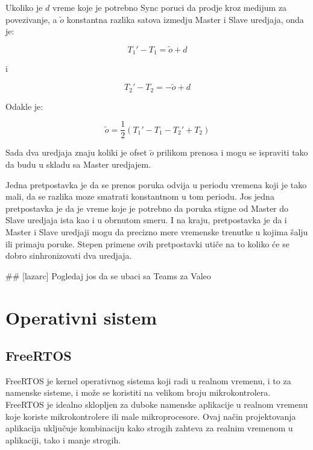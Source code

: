 \documentclass[a4paper,12pt, master]{etf}
\begin{document}
	Ukoliko je $d$ vreme koje je potrebno Sync poruci da prodje kroz medijum za povezivanje, a
        $\tilde{o}$ konstantna razlika satova izmedju Master i Slave uredjaja, onda je:

	\begin{equation}
		T_1' - T_1 = \tilde{o} + d
	\end{equation}

	i

	\begin{equation}
			T_2' - T_2 = -\tilde{o} + d
	\end{equation}

	Odakle je:

	\begin{equation}
		\tilde{o} = \frac{1}{2} (T_1' - T_1 - T_2' + T_2)
	\end{equation}

	Sada dva uredjaja znaju koliki je ofset $\tilde{o}$ prilikom prenosa i mogu se ispraviti
	tako da budu u skladu sa Master uredjajem.

	Jedna pretpostavka je da se prenos poruka odvija u periodu vremena koji je tako mali, da se
	razlika moze smatrati konstantnom u tom periodu. Jos jedna pretpostavka je da je vreme
	koje je	potrebno da poruka stigne od Master do Slave uredjaja ista kao i u obrnutom smeru.
	I na kraju, pretpostavka je da i Master i Slave uredjaji mogu da precizno mere vremenske
        trenutke u kojima \v{s}alju ili primaju poruke. Stepen primene ovih pretpostavki uti\v{c}e
        na to koliko \'{c}e se dobro sinhronizovati dva uredjaja.

        \#\# [lazarc] Pogledaj jos da se ubaci sa Teams za Valeo

	\newpage

	\chapter{Operativni sistem}

	\section{FreeRTOS}

	FreeRTOS je kernel operativnog sistema koji radi u realnom vremenu, i to za namenske
	sisteme, i mo\v{z}e se koristiti na velikom broju mikrokontrolera. FreeRTOS je idealno sklopljen
	za duboke namenske aplikacije u realnom vremenu koje koriste mikrokontrolere ili male mikroprocesore.
	Ovaj na\v{c}in projektovanja aplikacija uklju\v{c}uje kombinaciju kako strogih zahteva za realnim
	vremenom u aplikaciji, tako i manje strogih.
\end{document}
